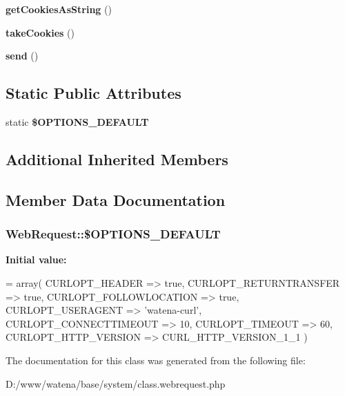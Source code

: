 \begin{DoxyCompactItemize}
\item 
\hypertarget{class_web_request_a09a2d42a5836ecf11540e2b9a75186ad}{{\bfseries get\-Cookies\-As\-String} ()}\label{class_web_request_a09a2d42a5836ecf11540e2b9a75186ad}

\item 
\hypertarget{class_web_request_a10c9c7cd782bc1084e9da4bfef6617f3}{{\bfseries take\-Cookies} ()}\label{class_web_request_a10c9c7cd782bc1084e9da4bfef6617f3}

\item 
\hypertarget{class_web_request_a6e57fabfb9dfe3c8032d61c24174492b}{{\bfseries send} ()}\label{class_web_request_a6e57fabfb9dfe3c8032d61c24174492b}

\end{DoxyCompactItemize}
\subsection*{Static Public Attributes}
\begin{DoxyCompactItemize}
\item 
static {\bfseries \$\-O\-P\-T\-I\-O\-N\-S\-\_\-\-D\-E\-F\-A\-U\-L\-T}
\end{DoxyCompactItemize}
\subsection*{Additional Inherited Members}


\subsection{Member Data Documentation}
\hypertarget{class_web_request_affadd6a55faa7527d71735f58fcc9339}{
\subsubsection[{\$\-O\-P\-T\-I\-O\-N\-S\-\_\-\-D\-E\-F\-A\-U\-L\-T}]{\setlength{\rightskip}{0pt plus 5cm}Web\-Request\-::\$\-O\-P\-T\-I\-O\-N\-S\-\_\-\-D\-E\-F\-A\-U\-L\-T\hspace{0.3cm}{\ttfamily [static]}}}\label{class_web_request_affadd6a55faa7527d71735f58fcc9339}
{\bfseries Initial value\-:}
\begin{DoxyCode}
= array(
        CURLOPT\_HEADER          => \textcolor{keyword}{true},
        CURLOPT\_RETURNTRANSFER  => \textcolor{keyword}{true},
        CURLOPT\_FOLLOWLOCATION  => \textcolor{keyword}{true},
        CURLOPT\_USERAGENT       => \textcolor{stringliteral}{'watena-curl'},
        CURLOPT\_CONNECTTIMEOUT  => 10,
        CURLOPT\_TIMEOUT         => 60,
        CURLOPT\_HTTP\_VERSION    => CURL\_HTTP\_VERSION\_1\_1
    )
\end{DoxyCode}


The documentation for this class was generated from the following file\-:\begin{DoxyCompactItemize}
\item 
D\-:/www/watena/base/system/class.\-webrequest.\-php\end{DoxyCompactItemize}
